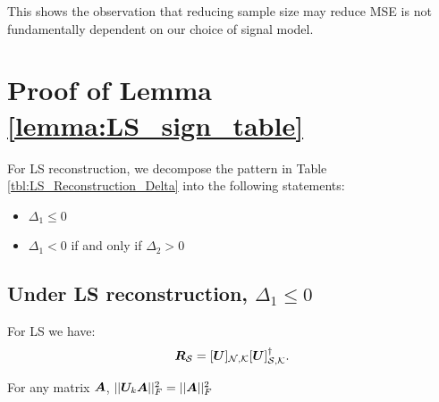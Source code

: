 This shows the observation that reducing sample size may reduce MSE is not fundamentally dependent on our choice of signal model.
\fi
\section{Proof of Lemma \ref{lemma:LS_sign_table}}
\label{app:table_delta_proof}
{\color{black}
For LS reconstruction, we decompose the pattern in Table \ref{tbl:LS_Reconstruction_Delta} into the following statements: 
\begin{itemize}
    \item $\Delta_{1} \leq 0$
    \item $\Delta_{1} < 0 $ if and only if $ \Delta_{2} > 0$
\end{itemize}
}
\subsection{Under LS reconstruction, \texorpdfstring{$\Delta_{1} \leq 0$}{\textDelta\textoneinferior =< 0}}
\label{app:delta_1_non_positive}
For LS we have:  \[\matr{R}_{\set{S}} = \matrsubU{N}[\matr{U}]_{\set{S},\set{K}}^{\dagger}.\]

\iffalse
\begin{lemma}
\label{lemma:frob_orthog}
    For any matrix $\bm{A}$, $||\bm{U}_{k}\bm{A}||^{2}_{F} = ||\bm{A}||^{2}_{F}$
\end{lemma}

